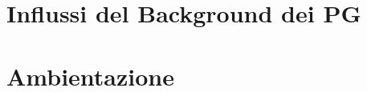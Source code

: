 \documentclass[10pt,twoside,twocolumn,openany]{dndbook}
\begin{document}
\chapter{Influssi del Background dei PG}




\chapter{Ambientazione}


\end{document}
